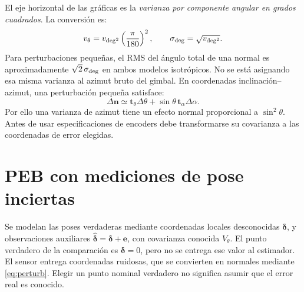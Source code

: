 \documentclass[11pt,a4paper]{article}
\begin{document}
El eje horizontal de las gráficas es la \emph{varianza por componente angular en grados cuadrados}. La conversión es:
\begin{equation}
 v_\theta=v_{\rm deg^2}\left(\frac\pi{180}\right)^2,\qquad
 \sigma_{\rm deg}=\sqrt{v_{\rm deg^2}}.
\end{equation}
Para perturbaciones pequeñas, el RMS del ángulo total de una normal es aproximadamente $\sqrt2\,\sigma_{\rm deg}$ en ambos modelos isotrópicos. No se está asignando esa misma varianza al azimut bruto del gimbal. En coordenadas inclinación--azimut, una perturbación pequeña satisface:
\begin{equation}
 \Delta\mathbf n\simeq\mathbf t_\theta\Delta\theta+
 \sin\theta\,\mathbf t_\alpha\Delta\alpha.
\end{equation}
Por ello una varianza de azimut tiene un efecto normal proporcional a $\sin^2\theta$. Antes de usar especificaciones de encoders debe transformarse su covarianza a las coordenadas de error elegidas.

\section{PEB con mediciones de pose inciertas}
Se modelan las poses verdaderas mediante coordenadas locales desconocidas $\boldsymbol\delta$, y observaciones auxiliares $\hat{\boldsymbol\delta}=\boldsymbol\delta+\mathbf e$, con covarianza conocida $V_\theta$. El punto verdadero de la comparación es $\boldsymbol\delta=0$, pero no se entrega ese valor al estimador. El sensor entrega coordenadas ruidosas, que se convierten en normales mediante \eqref{eq:perturb}. Elegir un punto nominal verdadero no significa asumir que el error real es conocido.
\end{document}

